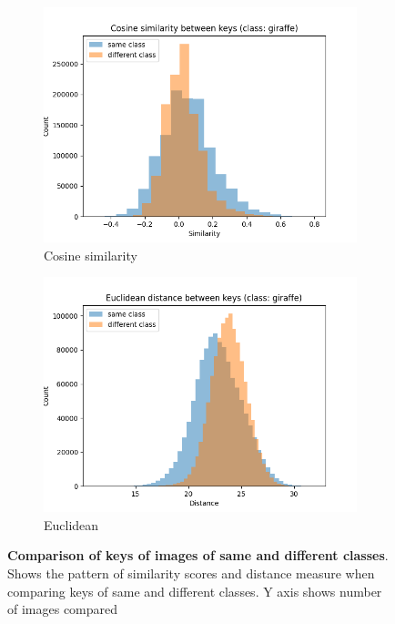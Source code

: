 \begin{figure}[h]
	\centering
	\begin{subfigure}[b]{0.47\textwidth}
		\centering
		\includegraphics[width=\textwidth]{Images/same_vs_diff_class/plot_giraffe_cosine.png}
		\caption{Cosine similarity}
	\end{subfigure}
	\quad
	\begin{subfigure}[b]{0.47\textwidth}  
		\centering 
		\includegraphics[width=\textwidth]{Images/same_vs_diff_class/plot_giraffe_euc.png}
		\caption{Euclidean}
	\end{subfigure}
	\caption[\textbf{Comparison of keys of images of same and different classes}]{\textbf{Comparison of keys of images of same and different classes}. Shows the pattern of similarity scores and distance measure when comparing keys of same and different classes. Y axis shows number of images compared }
	\label{fig:same_vs_diff}
\end{figure}

